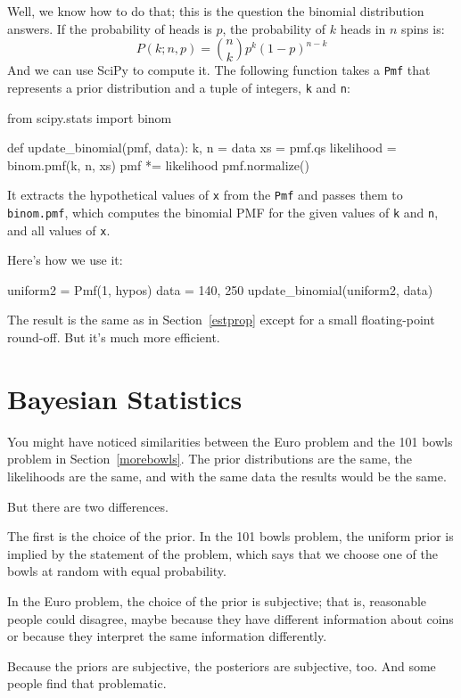 \documentclass[12pt]{book}
\theoremstyle{exercise}
\newcommand{\py}[1]{{\tt #1}}%
\begin{document}
Well, we know how to do that; this is the question the binomial distribution answers.
If the probability of heads is $p$, the probability of $k$ heads in $n$ spins is:
%
\[ P(k; n, p) = \binom{n}{k} p^k (1-p)^{n-k} \]
%
And we can use SciPy to compute it.
The following function takes a \py{Pmf} that represents a prior distribution and a tuple of integers, \py{k} and \py{n}:

\begin{code}
from scipy.stats import binom

def update_binomial(pmf, data):
    k, n = data
    xs = pmf.qs
    likelihood = binom.pmf(k, n, xs)
    pmf *= likelihood
    pmf.normalize()
\end{code}

It extracts the hypothetical values of \py{x} from the \py{Pmf} and passes them to \py{binom.pmf}, which computes the binomial PMF for the given values of \py{k} and \py{n}, and all values of \py{x}.

Here's how we use it:

\begin{code}
uniform2 = Pmf(1, hypos)
data = 140, 250
update_binomial(uniform2, data)
\end{code}

The result is the same as in Section~\ref{estprop} except for a small floating-point round-off.
But it's much more efficient.


\section{Bayesian Statistics}

You might have noticed similarities between the Euro problem and the 101 bowls problem in Section~\ref{morebowls}.
The prior distributions are the same, the likelihoods are the same, and with the same data the results would be the same.

But there are two differences.

The first is the choice of the prior.
In the 101 bowls problem, the uniform prior is implied by the statement of the problem, which says that we choose one of the bowls at random with equal probability.

In the Euro problem, the choice of the prior is subjective; that is, reasonable people could disagree, maybe because they have different information about coins or because they interpret the same information differently.

Because the priors are subjective, the posteriors are subjective, too.
And some people find that problematic.
\end{document}
